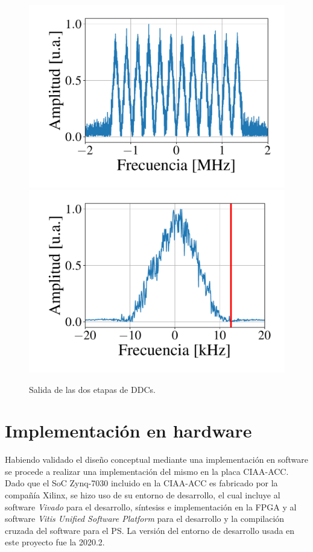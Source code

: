 \documentclass[../../main.tex]{subfiles}
\begin{document}
\begin{figure}[H]
    \centering
    {\includegraphics[width=0.49\linewidth]{DDC-band.pdf}}
    \hspace{\fill}%
    {\includegraphics[width=0.49\linewidth]{DDC-beam.pdf}}
    \caption{Salida de las dos etapas de DDCs.}
    \label{fig::DDC-output}
\end{figure}

\section{Implementación en hardware}
Habiendo validado el diseño conceptual mediante una implementación en software se procede a realizar una implementación del mismo en la placa CIAA-ACC. Dado que el SoC Zynq-7030 incluido en la CIAA-ACC es fabricado por la compañía Xilinx, se hizo uso de su entorno de desarrollo, el cual incluye al software \textit{Vivado} \cite{vivado} para el desarrollo, síntesiss e implementación en la FPGA y al software \textit{Vitis Unified Software Platform} \cite{vitis} para el desarrollo y la compilación cruzada \cite{cross-compilation} del software para el PS. La versión del entorno de desarrollo usada en este proyecto fue la 2020.2.
\end{document}
